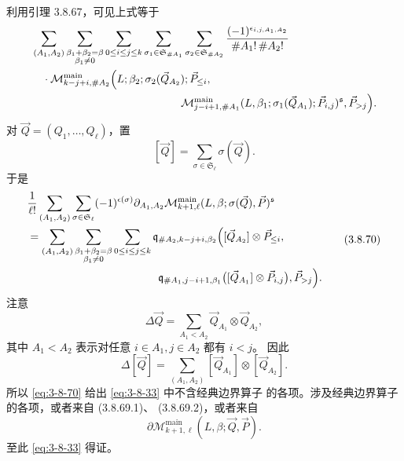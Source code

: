 利用引理 3.8.67，可见上式等于
\[
\begin{aligned}
&\sum_{(A_1,A_2)}
 \sum_{\substack{\beta_1+\beta_2=\beta\\\beta_1\ne0}}
 \sum_{0\leq i\leq j\leq k}
 \sum_{\sigma_1\in\mathfrak S_{\#A_1}}
 \sum_{\sigma_2\in\mathfrak S_{\#A_2}}
 \frac{(-1)^{\epsilon_{i,j,A_1,A_2}}}
 {\#A_1!\,\#A_2!}\\
&\quad\cdot
 \mathcal M_{k-j+i,\#A_2}^{\mathrm{main}}
 \Bigl(
 L;\beta_2;\sigma_2(\vec Q_{A_2});
 \vec P_{\leq i},\\
&\hspace{48mm}
 \mathcal M_{j-i+1,\#A_1}^{\mathrm{main}}
 (L,\beta_1;\sigma_1(\vec Q_{A_1});\vec P_{i,j})^{\mathfrak s},
 \vec P_{>j}
 \Bigr).
\end{aligned}
\]
对 $\vec Q=(Q_1,\ldots,Q_\ell)$，置
\[
 [\vec Q]
 =
 \sum_{\sigma\in\mathfrak S_\ell}\sigma(\vec Q).
\]
于是
\begin{equation}
\begin{aligned}
&\frac1{\ell!}
 \sum_{(A_1,A_2)}
 \sum_{\sigma\in\mathfrak S_\ell}
 (-1)^{\epsilon(\sigma)}
 \partial_{A_1,A_2}
 \mathcal M_{k+1,\ell}^{\mathrm{main}}
 (L,\beta;\sigma(\vec Q),\vec P)^{\mathfrak s}\\
&=
 \sum_{(A_1,A_2)}
 \sum_{\substack{\beta_1+\beta_2=\beta\\\beta_1\ne0}}
 \sum_{0\leq i\leq j\leq k}
 \mathfrak q_{\#A_2,k-j+i,\beta_2}
 \Bigl(
 [\vec Q_{A_2}]\otimes
 \vec P_{\leq i},\\
&\hspace{42mm}
 \mathfrak q_{\#A_1,j-i+1,\beta_1}
 \bigl([\vec Q_{A_1}]\otimes\vec P_{i,j}\bigr),
 \vec P_{>j}
 \Bigr).
\end{aligned}
\tag{3.8.70}\label{eq:3-8-70}
\end{equation}
注意
\[
 \Delta\vec Q
 =
 \sum_{A_1<A_2}\vec Q_{A_1}\otimes\vec Q_{A_2},
\]
其中 $A_1<A_2$ 表示对任意 $i\in A_1,j\in A_2$ 都有 $i<j$。
因此
\[
 \Delta[\vec Q]
 =
 \sum_{(A_1,A_2)}
 [\vec Q_{A_1}]\otimes[\vec Q_{A_2}].
\]
所以 \eqref{eq:3-8-70} 给出 \eqref{eq:3-8-33} 中不含经典边界算子
的各项。涉及经典边界算子的各项，或者来自 (3.8.69.1)、
(3.8.69.2)，或者来自
\[
 \partial\mathcal M_{k+1,\ell}^{\mathrm{main}}
 (L,\beta;\vec Q,\vec P).
\]
至此 \eqref{eq:3-8-33} 得证。

